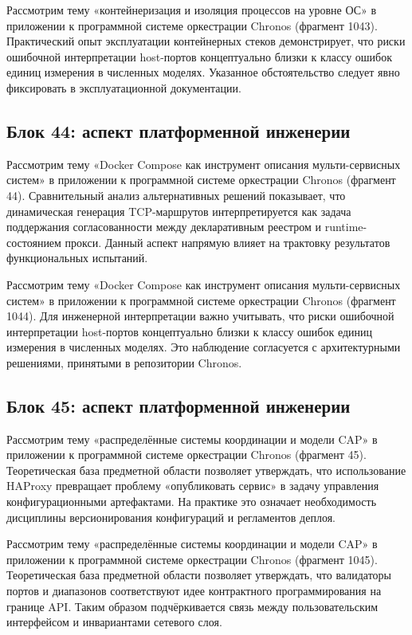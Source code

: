  Рассмотрим тему «контейнеризация и изоляция процессов на уровне ОС» в приложении к программной системе оркестрации Chronos (фрагмент 1043). Практический опыт эксплуатации контейнерных стеков демонстрирует, что риски ошибочной интерпретации host-портов концептуально близки к классу ошибок единиц измерения в численных моделях. Указанное обстоятельство следует явно фиксировать в эксплуатационной документации.

\subsection{Блок 44: аспект платформенной инженерии}
 Рассмотрим тему «Docker Compose как инструмент описания мульти-сервисных систем» в приложении к программной системе оркестрации Chronos (фрагмент 44). Сравнительный анализ альтернативных решений показывает, что динамическая генерация TCP-маршрутов интерпретируется как задача поддержания согласованности между декларативным реестром и runtime-состоянием прокси. Данный аспект напрямую влияет на трактовку результатов функциональных испытаний.

 Рассмотрим тему «Docker Compose как инструмент описания мульти-сервисных систем» в приложении к программной системе оркестрации Chronos (фрагмент 1044). Для инженерной интерпретации важно учитывать, что риски ошибочной интерпретации host-портов концептуально близки к классу ошибок единиц измерения в численных моделях. Это наблюдение согласуется с архитектурными решениями, принятыми в репозитории Chronos.

\subsection{Блок 45: аспект платформенной инженерии}
 Рассмотрим тему «распределённые системы координации и модели CAP» в приложении к программной системе оркестрации Chronos (фрагмент 45). Теоретическая база предметной области позволяет утверждать, что использование HAProxy превращает проблему «опубликовать сервис» в задачу управления конфигурационными артефактами. На практике это означает необходимость дисциплины версионирования конфигураций и регламентов деплоя.

 Рассмотрим тему «распределённые системы координации и модели CAP» в приложении к программной системе оркестрации Chronos (фрагмент 1045). Теоретическая база предметной области позволяет утверждать, что валидаторы портов и диапазонов соответствуют идее контрактного программирования на границе API. Таким образом подчёркивается связь между пользовательским интерфейсом и инвариантами сетевого слоя.

